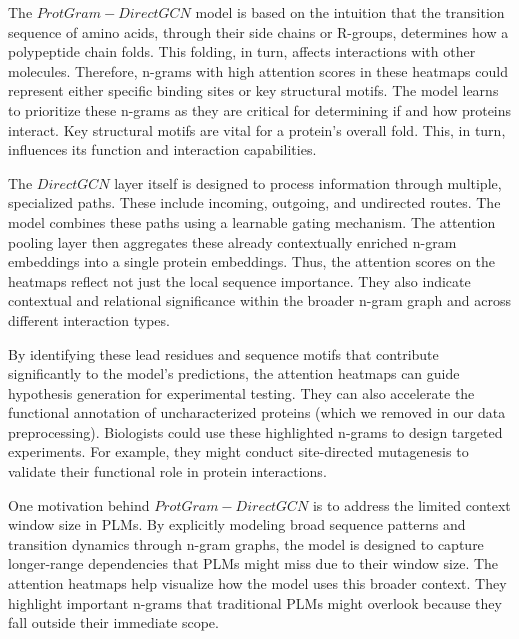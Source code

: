 \documentclass[utf8]{article}
\begin{document}
	The $ProtGram-DirectGCN$ model is based on the intuition that the transition sequence of amino acids, through their side chains or R-groups, determines how a polypeptide chain folds. This folding, in turn, affects interactions with other molecules. Therefore, n-grams with high attention scores in these heatmaps could represent either specific binding sites or key structural motifs. The model learns to prioritize these n-grams as they are critical for determining if and how proteins interact. Key structural motifs are vital for a protein's overall fold. This, in turn, influences its function and interaction capabilities.
	
	The $DirectGCN$ layer itself is designed to process information through multiple, specialized paths. These include incoming, outgoing, and undirected routes. The model combines these paths using a learnable gating mechanism. The attention pooling layer then aggregates these already contextually enriched n-gram embeddings into a single protein embeddings. Thus, the attention scores on the heatmaps reflect not just the local sequence importance. They also indicate contextual and relational significance within the broader n-gram graph and across different interaction types.
	
	By identifying these lead residues and sequence motifs that contribute significantly to the model's predictions, the attention heatmaps can guide hypothesis generation for experimental testing. They can also accelerate the functional annotation of uncharacterized proteins (which we removed in our data preprocessing). Biologists could use these highlighted n-grams to design targeted experiments. For example, they might conduct site-directed mutagenesis to validate their functional role in protein interactions.
	
	One motivation behind $ProtGram-DirectGCN$ is to address the limited context window size in PLMs. By explicitly modeling broad sequence patterns and transition dynamics through n-gram graphs, the model is designed to capture longer-range dependencies that PLMs might miss due to their window size. The attention heatmaps help visualize how the model uses this broader context. They highlight important n-grams that traditional PLMs might overlook because they fall outside their immediate scope.
	
\end{document}
